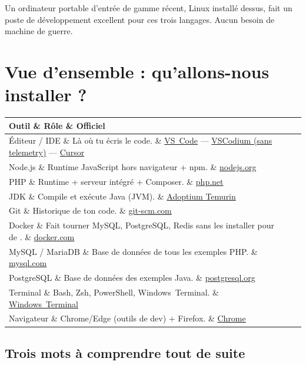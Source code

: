 \documentclass[12pt,a4paper,twoside,openright]{book}
\makeatletter
\newcommand{\link}[2]{\href{#2}{#1}}
\newenvironment{tabz}[1]{\rowcolors{2}{white}{tralight}%
  \small\setlength{\tabcolsep}{5pt}\setlength{\LTpre}{3pt}\setlength{\LTpost}{3pt}%
  \begin{longtable}{@{}#1@{}}\toprule}
  {\bottomrule\end{longtable}\normalfont\setlength{\tabcolsep}{6pt}}
\newcommand{\thd}[1]{\textbf{\color{white}#1}}
\newcommand{\headrow}{\rowcolor{theadbg}}
\makeatother
\begin{document}
Un ordinateur portable d'entr\'ee de gamme r\'ecent, Linux install\'e dessus, fait un poste de
d\'eveloppement excellent pour ces trois langages. Aucun besoin de machine de guerre.

\section{Vue d'ensemble : qu'allons-nous installer ?}

\begin{tabz}{llX}
  \headrow \thd{Outil} \& \thd{R\^ole} \& \thd{Officiel} \\
  \midrule
  \'Editeur / IDE \& L\`a o\`u tu \'ecris le code. \& \link{VS~Code}{https://code.visualstudio.com/} --- \link{VSCodium (sans telemetry)}{https://vscodium.com/} --- \link{Cursor}{https://www.cursor.com/} \\
  Node.js \& Runtime JavaScript hors navigateur + npm. \& \link{nodejs.org}{https://nodejs.org/fr/download} \\
  PHP \& Runtime + serveur int\'egr\'e + Composer. \& \link{php.net}{https://www.php.net/downloads.php} \\
  JDK \& Compile et ex\'ecute Java (JVM). \& \link{Adoptium Temurin}{https://adoptium.net/fr/} \\
  Git \& Historique de ton code. \& \link{git-scm.com}{https://git-scm.com/downloads} \\
  Docker \& Fait tourner MySQL, PostgreSQL, Redis sans les installer \og  pour de  \fg{}. \& \link{docker.com}{https://www.docker.com/products/docker-desktop/} \\
  MySQL / MariaDB \& Base de donn\'ees de tous les exemples PHP. \& \link{mysql.com}{https://dev.mysql.com/downloads/mysql/} \\
  PostgreSQL \& Base de donn\'ees des exemples Java. \& \link{postgresql.org}{https://www.postgresql.org/download/} \\
  Terminal \& Bash, Zsh, PowerShell, Windows~Terminal. \& \link{Windows~Terminal}{https://apps.microsoft.com/detail/9N0DX20HK701} \\
  Navigateur \& Chrome/Edge (outils de dev) + Firefox. \& \link{Chrome}{https://www.google.com/chrome/} \\
\end{tabz}

\subsection{Trois mots \`a comprendre tout de suite}
\end{document}

